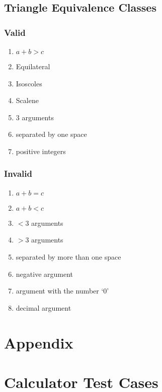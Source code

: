 \documentclass[letterpaper]{article}
\begin{document}
\subsection*{Triangle Equivalence Classes}
\subsubsection*{Valid}
\begin{enumerate}
    \item $a + b > c$
    \item Equilateral
    \item Isoscoles
    \item Scalene
    \item 3 arguments
    \item separated by one space
    \item positive integers
\end{enumerate}

\subsubsection*{Invalid}
\begin{enumerate}
    \item $a + b = c$
    \item $ a + b < c$
    \item $< 3$ arguments
    \item $> 3$ arguments
    \item separated by more than one space
    \item negative argument
    \item argument with the number `0'
    \item decimal argument
\end{enumerate}





\appendix
\section*{Appendix}
\section{Calculator Test Cases} \label{calculatortestcases}


% 
\end{document}
